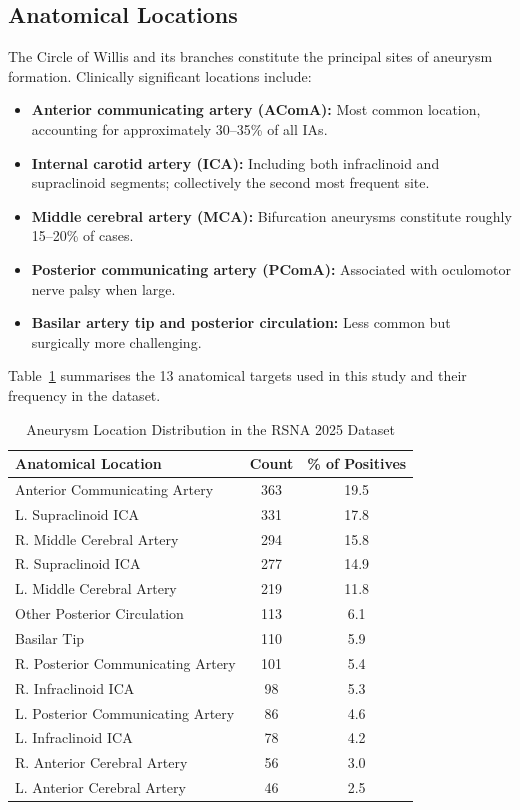 \documentclass[journal]{IEEEtran}
\begin{document}
\subsection{Anatomical Locations}

The Circle of Willis and its branches constitute the principal sites of
aneurysm formation. Clinically significant locations include:

\begin{itemize}
  \item \textbf{Anterior communicating artery (AComA):} Most common location,
        accounting for approximately 30--35\% of all IAs.
  \item \textbf{Internal carotid artery (ICA):} Including both infraclinoid
        and supraclinoid segments; collectively the second most frequent site.
  \item \textbf{Middle cerebral artery (MCA):} Bifurcation aneurysms
        constitute roughly 15--20\% of cases.
  \item \textbf{Posterior communicating artery (PComA):} Associated with
        oculomotor nerve palsy when large.
  \item \textbf{Basilar artery tip and posterior circulation:} Less common but
        surgically more challenging.
\end{itemize}

Table~\ref{tab:locations} summarises the 13 anatomical targets used in this
study and their frequency in the dataset.

\begin{table}[H]
\renewcommand{\arraystretch}{1.3}
\caption{Aneurysm Location Distribution in the RSNA 2025 Dataset}
\label{tab:locations}
\centering
\begin{tabular}{lcc}
\toprule
\textbf{Anatomical Location} & \textbf{Count} & \textbf{\% of Positives} \\
\midrule
Anterior Communicating Artery          & 363 & 19.5 \\
L. Supraclinoid ICA                    & 331 & 17.8 \\
R. Middle Cerebral Artery              & 294 & 15.8 \\
R. Supraclinoid ICA                    & 277 & 14.9 \\
L. Middle Cerebral Artery              & 219 & 11.8 \\
Other Posterior Circulation            & 113 &  6.1 \\
Basilar Tip                            & 110 &  5.9 \\
R. Posterior Communicating Artery      & 101 &  5.4 \\
R. Infraclinoid ICA                    &  98 &  5.3 \\
L. Posterior Communicating Artery      &  86 &  4.6 \\
L. Infraclinoid ICA                    &  78 &  4.2 \\
R. Anterior Cerebral Artery            &  56 &  3.0 \\
L. Anterior Cerebral Artery            &  46 &  2.5 \\
\bottomrule
\end{tabular}
\end{table}
\end{document}

